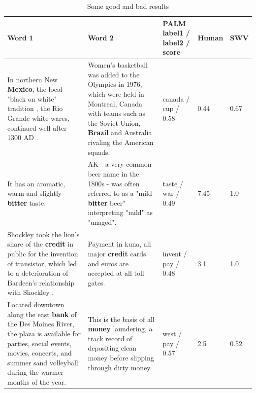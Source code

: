 \documentclass[11pt]{article}
\begin{document}
\begin{table}[t]
    \begin{tabular}{|p{5cm}|p{5cm}|p{2.5cm}|p{1cm}|p{1cm}|}
    \hline
    Word 1                                                                                                                                                                                                      & Word 2                                                                                                                                                                                                      & PALM label1 / label2 / score & Human & SWV  \\ \hline
    In northern New \textbf{Mexico}, the local "black on white" tradition , the Rio Grande white wares, continued well after 1300 AD .                                                           & Women's basketball was added to the Olympics in 1976, which were held in Montreal, Canada with teams such as the Soviet Union, \textbf{Brazil} and Australia rivaling the American squads.  & canada / cup / 0.58          & 0.44  & 0.67 \\ \hline
    It has an aromatic, warm and slightly \textbf{bitter} taste.                                                                                                                                  & AK - a very common beer name in the 1800s - was often referred to as a "mild \textbf{bitter} beer" interpreting "mild" as "unaged".                                                       & taste / war / 0.49           & 7.45  & 1.0  \\ \hline
    Shockley took the lion's share of the \textbf{credit} in public for the invention of transistor, which led to a deterioration of Bardeen's relationship with Shockley .                                         & Payment in kuna, all major \textbf{credit} cards and euros are accepted at all toll gates.                                                                                                                       & invent / pay / 0.48          & 3.1   & 1.0  \\ \hline
    Located downtown along the east \textbf{bank} of the Des Moines River, the plaza is available for parties, social events, movies, concerts, and summer sand volleyball during the warmer months of the year. & This is the basis of all \textbf{money} laundering, a track record of depositing clean money before slipping through dirty money.                                                                                & west / pay / 0.57            & 2.5   & 0.52 \\\hline
    \end{tabular}
    \caption{Some good and bad results}
\end{table}
\end{document}

